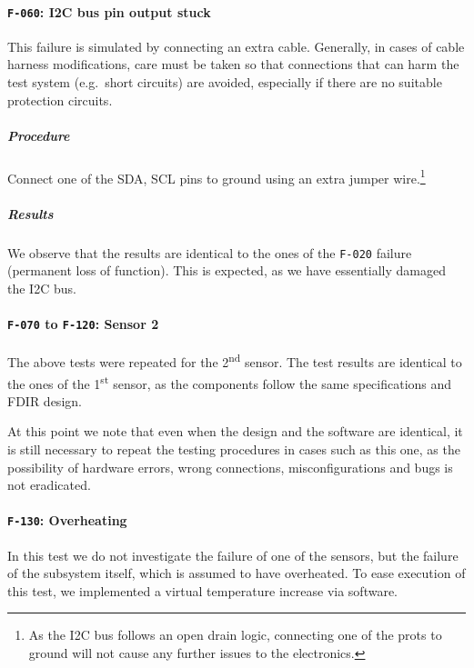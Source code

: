 \documentclass[a4paper,nobib]{tufte-book}
\begin{document}
\FloatBarrier
\paragraph{\textbf{\texttt{F-060}: \acs{I2C} bus pin output stuck}}\hspace{0pt}

This failure is simulated by connecting an extra cable. Generally, in cases of cable harness modifications, care must be taken so that connections that can harm the test system (e.g.\ short circuits) are avoided, especially if there are no suitable protection circuits.

\subparagraph{Procedure}
\begin{compactenum}
	\item Connect one of the \acs{SDA}, \acs{SCL} pins to ground using an extra jumper wire.\footnote{As the \acs{I2C} bus follows an open drain logic, connecting one of the prots to ground will not cause any further issues to the electronics.}
\end{compactenum}

\subparagraph{Results}
We observe that the results are identical to the ones of the \texttt{F-020} failure (permanent loss of function). This is expected, as we have essentially damaged the \acs{I2C} bus.

\paragraph{\textbf{\texttt{F-070} to \texttt{F-120}: Sensor 2}}\hspace{0pt}

The above tests were repeated for the 2\textsuperscript{nd} sensor. The test results are identical to the ones of the 1\textsuperscript{st} sensor, as the components follow the same specifications and \acs{FDIR} design.

At this point we note that even when the design and the software are identical, it is still necessary to repeat the testing procedures in cases such as this one, as the possibility of hardware errors, wrong connections, misconfigurations and bugs is not eradicated.

\clearpage
\paragraph{\textbf{\texttt{F-130}: Overheating}}\hspace{0pt}

In this test we do not investigate the failure of one of the sensors, but the failure of the subsystem itself, which is assumed to have overheated. To ease execution of this test, we implemented a virtual temperature increase via software.
\end{document}
